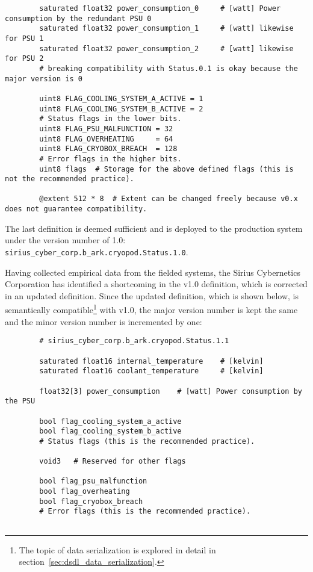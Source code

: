 \begin{remark}[breakable]
\begin{verbatim}
        saturated float32 power_consumption_0     # [watt] Power consumption by the redundant PSU 0
        saturated float32 power_consumption_1     # [watt] likewise for PSU 1
        saturated float32 power_consumption_2     # [watt] likewise for PSU 2
        # breaking compatibility with Status.0.1 is okay because the major version is 0

        uint8 FLAG_COOLING_SYSTEM_A_ACTIVE = 1
        uint8 FLAG_COOLING_SYSTEM_B_ACTIVE = 2
        # Status flags in the lower bits.
        uint8 FLAG_PSU_MALFUNCTION = 32
        uint8 FLAG_OVERHEATING     = 64
        uint8 FLAG_CRYOBOX_BREACH  = 128
        # Error flags in the higher bits.
        uint8 flags  # Storage for the above defined flags (this is not the recommended practice).

        @extent 512 * 8  # Extent can be changed freely because v0.x does not guarantee compatibility.
    \end{verbatim}

    The last definition is deemed sufficient and is deployed to the production system
    under the version number of 1.0: \verb|sirius_cyber_corp.b_ark.cryopod.Status.1.0|.

    Having collected empirical data from the fielded systems, the Sirius Cybernetics Corporation has
    identified a shortcoming in the v1.0 definition, which is corrected in an updated definition.
    Since the updated definition, which is shown below, is semantically compatible\footnote{%
        The topic of data serialization is explored in detail in section~\ref{sec:dsdl_data_serialization}.
    } with v1.0, the major version number is kept the same and the minor version number is incremented by one:

    \begin{verbatim}
        # sirius_cyber_corp.b_ark.cryopod.Status.1.1

        saturated float16 internal_temperature    # [kelvin]
        saturated float16 coolant_temperature     # [kelvin]

        float32[3] power_consumption    # [watt] Power consumption by the PSU

        bool flag_cooling_system_a_active
        bool flag_cooling_system_b_active
        # Status flags (this is the recommended practice).

        void3   # Reserved for other flags

        bool flag_psu_malfunction
        bool flag_overheating
        bool flag_cryobox_breach
        # Error flags (this is the recommended practice).


\end{verbatim}
\end{remark}
